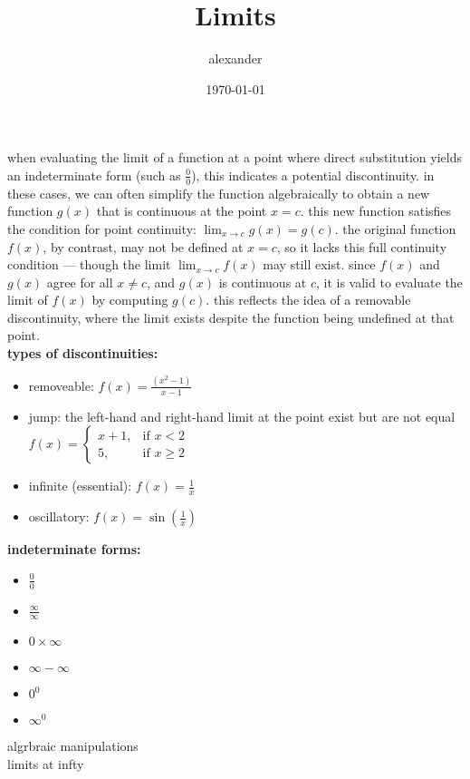 \documentclass{article}
\title{Limits}
\author{alexander}
\date{\today}
\begin{document}
\maketitle

when evaluating the limit of a function at a point where direct substitution yields an indeterminate form (such as $\frac{0}{0}$), this indicates a potential discontinuity. in these cases, we can often simplify the function algebraically to obtain a new function $g(x)$ that is continuous at the point $x = c$. this new function satisfies the condition for point continuity: $\lim_{x \to c} g(x) = g(c)$. the original function $f(x)$, by contrast, may not be defined at $x = c$, so it lacks this full continuity condition — though the limit $\lim_{x \to c} f(x)$ may still exist. since $f(x)$ and $g(x)$ agree for all $x \neq c$, and $g(x)$ is continuous at $c$, it is valid to evaluate the limit of $f(x)$ by computing $g(c)$. this reflects the idea of a removable discontinuity, where the limit exists despite the function being undefined at that point.\\



\textbf{types of discontinuities:}
	\begin{itemize}
		\item removeable: $f(x) = \frac{(x^2 - 1)}{x - 1}$
		\item jump: the left-hand and right-hand limit at the point exist but are not equal $f(x) = \begin{cases} x+1, & \text{if } x < 2\\ 5, & \text{if } x \geq 2\end{cases}$
		\item infinite (essential): $f(x) = \frac{1}{x}$
		\item oscillatory: $f(x) = \sin(\frac{1}{x})$
	\end{itemize}

\textbf{indeterminate forms:}
	\begin{itemize}
		\item $\frac{0}{0}$
		\item $\frac{\infty}{\infty}$
		\item $0 \times \infty$
		\item $\infty - \infty$
		\item $0^0$
		\item $\infty^0$
	\end{itemize}

algrbraic manipulations\\
limits at infty\\
\end{document}
